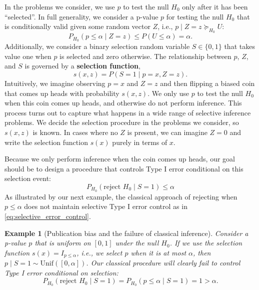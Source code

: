 \documentclass{article}
\newtheorem{example}{Example}
\begin{document}
In the problems we consider, we use $p$ to test the null $H_0$ only after it has been ``selected''. In full generality, we consider a p-value $p$ for testing the null $H_0$ that is conditionally valid given some random vector $Z$, i.e., $p \mid Z = z \succeq_{H_0} U$:
\begin{equation}
    \label{eq:valid_given_z}
    P_{H_0}(p \leq \alpha \mid Z =z) \leq P(U \leq \alpha)  = \alpha.
\end{equation}
Additionally, we consider a binary selection random variable $S \in \{0, 1\}$ that takes value one when $p$ is selected and zero otherwise. The relationship between $p$, $Z$, and $S$ is governed by a \textbf{selection function},
\begin{equation*}
    s(x, z) = P(S = 1 \mid p = x, Z = z).
\end{equation*}
Intuitively, we imagine observing $p=x$ and $Z=z$ and then flipping a biased coin that comes up heads with probability $s(x, z)$. We only use $p$ to test the null $H_0$ when this coin comes up heads, and otherwise do not perform inference. This process turns out to capture what happens in a wide range of selective inference problems. We decide the selection procedure in the problems we consider, so $s(x, z)$ is known. In cases where no $Z$ is present, we can imagine $Z=0$ and write the selection function $s(x)$ purely in terms of $x$. 

Because we only perform inference when the coin comes up heads, our goal should be to design a procedure that controls Type I error conditional on this selection event:
\begin{equation}
    \label{eq:selective_error_control}
    P_{H_0}(\text{reject } H_0 \mid S = 1) \leq \alpha 
\end{equation}
As illustrated by our next example, the classical approach of rejecting when $p \leq \alpha$ does not maintain selective Type I error control as in \eqref{eq:selective_error_control}. 

\begin{example}[Publication bias and the failure of classical inference]
\label{exm:publication_bias}
Consider a p-value $p$ that is uniform on $[0, 1]$ under the null $H_0$. If we use the selection function $s(x) = I_{p \leq \alpha}$, i.e., we select $p$ when it is at most $\alpha$, then $p \mid S=1 \sim \text{Unif}([0, \alpha])$. Our classical procedure will clearly fail to control Type I error conditional on selection:
\begin{equation*}
    P_{H_0}(\text{reject } H_0 \mid S=1) = P_{H_0}(p \leq \alpha \mid S=1) = 1 > \alpha. 
\end{equation*}
\end{example}
\end{document}
